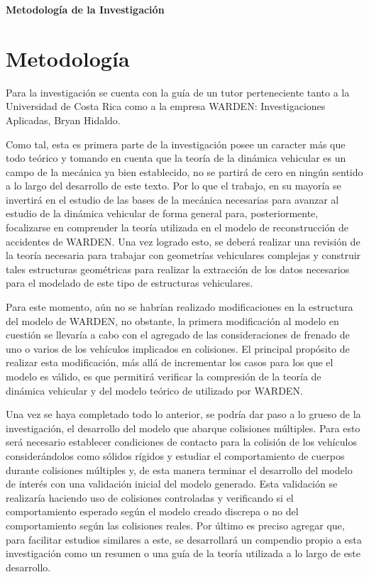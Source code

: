 \setcounter{section}{0}
\begin{singlespace}

\huge{\textbf{Metodología de la Investigación}}
\normalsize

\section{Metodología}
\hspace{1 cm}  Para la investigación se cuenta con la guía de un tutor perteneciente tanto a la Universidad de Costa Rica como a la empresa WARDEN: Investigaciones Aplicadas, Bryan Hidaldo.


\hspace{1 cm} Como tal, esta es primera parte de la investigación posee un caracter más que todo teórico y tomando en cuenta que la teoría de la dinámica vehicular es un campo de la mecánica ya bien establecido, no se partirá de cero en ningún sentido a lo largo del desarrollo de este texto. Por lo que el trabajo, en su mayoría se invertirá en el estudio de las bases de la mecánica necesarias para avanzar al estudio de la dinámica vehicular de forma general para, posteriormente, focalizarse en comprender la teoría utilizada en el modelo de reconstrucción de accidentes de WARDEN. Una vez logrado esto, se deberá realizar una revisión de la teoría necesaria para trabajar con geometrías vehiculares complejas y construir tales estructuras geométricas para realizar la extracción de los datos necesarios para el modelado de este tipo de estructuras vehiculares.

\hspace{1 cm} Para este momento, aún no se habrían realizado modificaciones en la estructura del modelo de WARDEN, no obstante, la primera modificación al modelo en cuestión se llevaría a cabo con el agregado de las consideraciones de frenado de uno o varios de los vehículos implicados en colisiones. El principal propósito de realizar esta modificación, más allá de incrementar los casos para los que el modelo es válido, es que permitirá verificar la compresión de la teoría de dinámica vehicular y del modelo teórico de utilizado por WARDEN.

\hspace{1 cm} Una vez  se haya completado todo lo anterior, se podría dar paso a lo grueso de la investigación, el desarrollo del modelo que abarque colisiones múltiples. Para esto será necesario establecer condiciones de contacto para la colisión de los vehículos considerándolos como sólidos rígidos y estudiar el comportamiento de cuerpos durante colisiones múltiples y, de esta manera terminar el desarrollo del modelo de interés con una validación inicial del modelo generado. Esta validación se realizaría haciendo uso de colisiones controladas y verificando si el comportamiento esperado según el modelo creado discrepa o no del comportamiento según las colisiones reales. Por último es preciso agregar que, para facilitar estudios similares a este, se desarrollará un compendio propio a esta investigación como un resumen o una guía de la teoría utilizada a lo largo de este desarrollo.




\end{singlespace}
